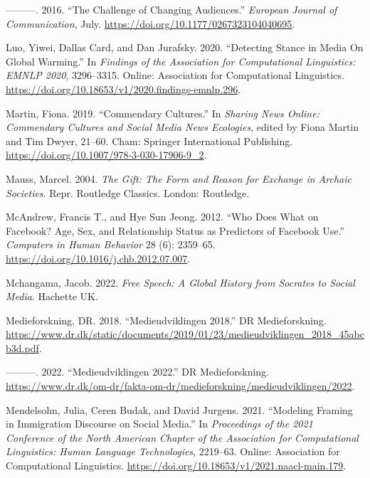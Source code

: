 \documentclass[
]{article}
\newlength{\cslhangindent}
\newlength{\cslentryspacingunit} %
\newenvironment{CSLReferences}[2] %
 {%
  \setlength{\parindent}{0pt}
  \ifodd #1
  \let\oldpar\par
  \def\par{\hangindent=\cslhangindent\oldpar}
  \fi
  \setlength{\parskip}{#2\cslentryspacingunit}
 }%
 {}
\begin{document}
\begin{CSLReferences}{1}{0}
\leavevmode{}%
---------. 2016. {``The {Challenge} of {Changing} {Audiences}.''}
\emph{European Journal of Communication}, July.
\url{https://doi.org/10.1177/0267323104040695}.

\leavevmode{}%
Luo, Yiwei, Dallas Card, and Dan Jurafsky. 2020. {``Detecting {Stance}
in {Media} {On} {Global} {Warming}.''} In \emph{Findings of the
{Association} for {Computational} {Linguistics}: {EMNLP} 2020},
3296--3315. Online: Association for Computational Linguistics.
\url{https://doi.org/10.18653/v1/2020.findings-emnlp.296}.

\leavevmode{}%
Martin, Fiona. 2019. {``Commendary {Cultures}.''} In \emph{Sharing
{News} {Online}: {Commendary} {Cultures} and {Social} {Media} {News}
{Ecologies}}, edited by Fiona Martin and Tim Dwyer, 21--60. Cham:
Springer International Publishing.
\url{https://doi.org/10.1007/978-3-030-17906-9_2}.

\leavevmode{}%
Mauss, Marcel. 2004. \emph{The Gift: The Form and Reason for Exchange in
Archaic Societies}. Repr. Routledge Classics. London: Routledge.

\leavevmode{}%
McAndrew, Francis T., and Hye Sun Jeong. 2012. {``Who Does What on
{Facebook}? {Age}, Sex, and Relationship Status as Predictors of
{Facebook} Use.''} \emph{Computers in Human Behavior} 28 (6): 2359--65.
\url{https://doi.org/10.1016/j.chb.2012.07.007}.

\leavevmode{}%
Mchangama, Jacob. 2022. \emph{Free {Speech}: {A} {Global} {History} from
{Socrates} to {Social} {Media}}. Hachette UK.

\leavevmode{}%
Medieforskning, DR. 2018. {``Medieudviklingen 2018.''} DR
Medieforskning.
\url{https://www.dr.dk/static/documents/2019/01/23/medieudviklingen_2018_45abcb3d.pdf}.

\leavevmode{}%
---------. 2022. {``Medieudviklingen 2022.''} DR Medieforskning.
\url{https://www.dr.dk/om-dr/fakta-om-dr/medieforskning/medieudviklingen/2022}.

\leavevmode{}%
Mendelsohn, Julia, Ceren Budak, and David Jurgens. 2021. {``Modeling
{Framing} in {Immigration} {Discourse} on {Social} {Media}.''} In
\emph{Proceedings of the 2021 {Conference} of the {North} {American}
{Chapter} of the {Association} for {Computational} {Linguistics}:
{Human} {Language} {Technologies}}, 2219--63. Online: Association for
Computational Linguistics.
\url{https://doi.org/10.18653/v1/2021.naacl-main.179}.


\end{CSLReferences}
\end{document}
